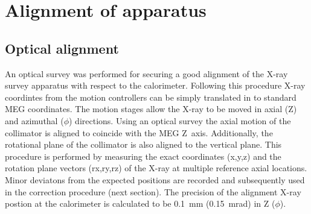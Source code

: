 \section{\label{sec4}Alignment of apparatus}
\subsection{Optical alignment}

An optical survey was performed for securing a good alignment of the
X-ray survey apparatus with respect to the calorimeter.  Following
this procedure X-ray coordintes from the motion controllers 
can be simply translated in to standard MEG coordinates.
The motion stages allow the X-ray to be moved in axial (Z) and
azimuthal ($\phi$) directions.  Using  an optical survey the axial
motion of the collimator is aligned to coincide with the MEG Z~axis.
Additionally, the rotational plane of the collimator is also aligned
to the vertical plane.  This procedure is performed by measuring the
exact coordinates (x,y,z) and the rotation plane vectors (rx,ry,rz) of
the X-ray at multiple reference axial locations.  Minor
deviatons from the expected positions are recorded and subsequently
used in the correction procedure (next section).  The precision of the
alignment X-ray postion at the calorimeter is calculated to be 0.1~mm
(0.15~mrad) in Z ($\phi$).


